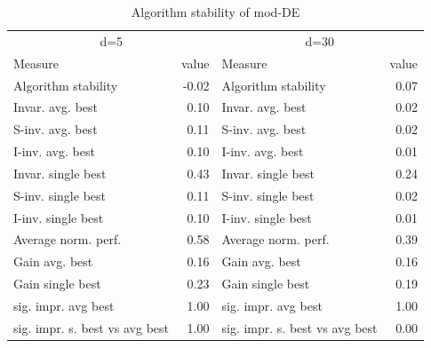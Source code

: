 \begin{table}
\caption{Algorithm stability of mod-DE}
\begin{tabular}{lrlr}
\toprule
\multicolumn{2}{c}{d=5} & \multicolumn{2}{c}{d=30} \\
Measure & value & Measure & value \\
\midrule
Algorithm stability & -0.02 & Algorithm stability & 0.07 \\
Invar. avg. best & 0.10 & Invar. avg. best & 0.02 \\
S-inv. avg. best & 0.11 & S-inv. avg. best & 0.02 \\
I-inv. avg. best & 0.10 & I-inv. avg. best & 0.01 \\
Invar. single best & 0.43 & Invar. single best & 0.24 \\
S-inv. single best & 0.11 & S-inv. single best & 0.02 \\
I-inv. single best & 0.10 & I-inv. single best & 0.01 \\
Average norm. perf. & 0.58 & Average norm. perf. & 0.39 \\
Gain avg. best & 0.16 & Gain avg. best & 0.16 \\
Gain single best & 0.23 & Gain single best & 0.19 \\
sig. impr. avg best & 1.00 & sig. impr. avg best & 1.00 \\
sig. impr. s. best vs avg best & 1.00 & sig. impr. s. best vs avg best & 0.00 \\
\bottomrule
\end{tabular}
\end{table}
